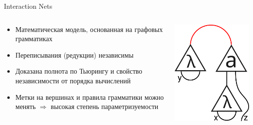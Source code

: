 \documentclass[aspectratio=169]{beamer}
\begin{document}
\begin{frame}{Interaction Nets}

    \begin{columns}
        \begin{column}{0.65\linewidth}
            \begin{itemize}
                \item Математическая модель, основанная на графовых грамматиках
                \item Переписывания (редукции) независимы
                \item Доказана полнота по Тьюрингу и свойство независимости от порядка вычислений
                \item Метки на вершинах и правила грамматики можно менять $\Rightarrow$ высокая степень параметризуемости
            \end{itemize}
        \end{column}
        \begin{column}{0.3\linewidth}
            \includegraphics[width=\linewidth]{pictures/lamda-graph.pdf}
        \end{column}
    \end{columns}
\end{frame}
\end{document}
